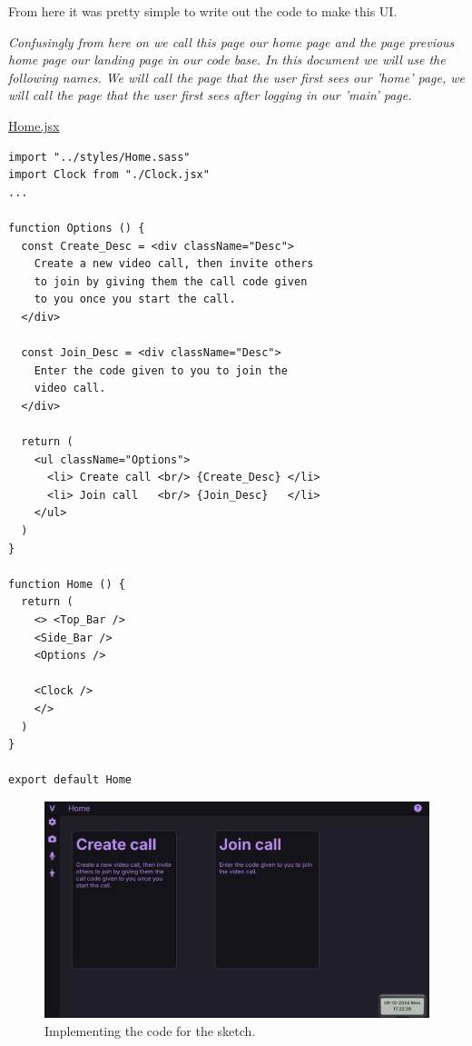 From here it was pretty simple to write out the code to make
this UI. \\ \vspace{0.1cm}

\textit{Confusingly from here on we call this page
our home page and the page previous home page our landing
page in our code base. In this document we will use the
following names. We will call the page that the user first
sees our 'home' page, we will call the page that the user
first sees after logging in our 'main' page.} \\
\vspace{0.2cm}

\underline{Home.jsx}

\begin{verbatim}
import "../styles/Home.sass"
import Clock from "./Clock.jsx"
...

function Options () {
  const Create_Desc = <div className="Desc">
    Create a new video call, then invite others
    to join by giving them the call code given
    to you once you start the call.
  </div>

  const Join_Desc = <div className="Desc">
    Enter the code given to you to join the
    video call.
  </div>

  return (
    <ul className="Options">
      <li> Create call <br/> {Create_Desc} </li>
      <li> Join call   <br/> {Join_Desc}   </li>
    </ul>
  )
}

function Home () {
  return (
    <> <Top_Bar />
    <Side_Bar />
    <Options />

    <Clock />
    </>
  )
}

export default Home
\end{verbatim}

\begin{figure}[H]
\centering

\includegraphics[scale=0.2]{Images/Sketch_final.png}

\caption{Implementing the code for the sketch.}
\end{figure}

